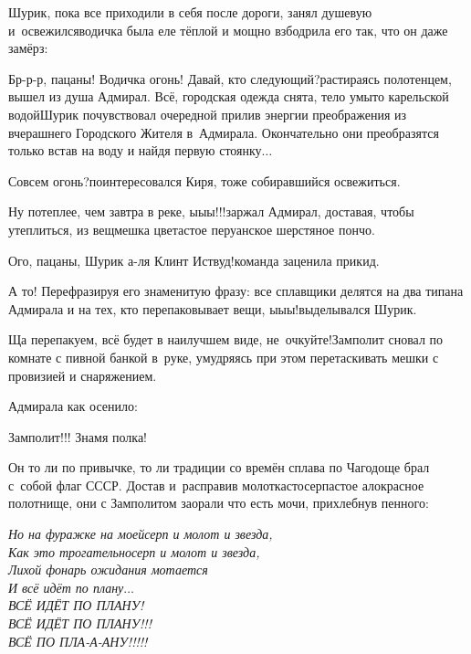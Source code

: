 Шурик, пока все приходили в себя после дороги, занял душевую и~освежился\mdash водичка была еле тёплой и мощно взбодрила его так, что он даже замёрз:

\diagdash Бр-р-р, пацаны! Водичка огонь! Давай, кто следующий?\mdash растираясь полотенцем, вышел из душа Адмирал. Всё, городская одежда снята, тело умыто карельской водой\mdash Шурик почувствовал очередной прилив энергии преображения из вчерашнего Городского Жителя в~Адмирала. Окончательно они преобразятся только встав на воду и найдя первую стоянку$\ldots$

\diagdash Совсем огонь?\mdash поинтересовался Киря, тоже собиравшийся освежиться.

\diagdash Ну потеплее, чем завтра в реке, ы\sdash ы\sdash ы!!!\mdash заржал Адмирал, доставая, чтобы утеплиться, из вещмешка цветастое перуанское шерстяное пончо.

\diagdash Ого, пацаны, Шурик а-ля Клинт Иствуд!\mdash команда заценила прикид.

\diagdash А то! Перефразируя его знаменитую фразу: все сплавщики делятся на два типа\mdash на Адмирала и на тех, кто перепаковывает вещи, ы\sdash ы\sdash ы!\mdash выделывался Шурик.

\diagdash Ща перепакуем, всё будет в наилучшем виде, не~очкуйте!\mdash Замполит сновал по комнате с пивной банкой в~руке, умудряясь при этом перетаскивать мешки с провизией и снаряжением.

Адмирала как осенило:

\diagdash Замполит!!! Знамя полка!

Он то ли по привычке, то ли традиции со времён сплава по Чагодоще брал с~собой флаг СССР. Достав и~расправив молоткасто\sdash серпастое ало\sdash красное полотнище, они с Замполитом заорали что есть мочи, прихлебнув пенного:

\vspace{0.2cm}
\noindent\textit{%
	\hspace*{1.2cm}Но на фуражке на моей\mdash серп и молот и звезда,\\
	\hspace*{1.2cm}Как это трогательно\mdash серп и молот и звезда,\\
	\hspace*{1.2cm}Лихой фонарь ожидания мотается\\
	\hspace*{1.2cm}И всё идёт по плану$\ldots$\\
	\hspace*{1.2cm}\large{ВСЁ ИДЁТ ПО ПЛАНУ!}\\
	\hspace*{1.2cm}\Large{ВСЁ ИДЁТ ПО ПЛАНУ!!!}\\
	\hspace*{1.2cm}\LARGE{ВСЁ ПО ПЛА-А-АНУ!!!!!}
}

